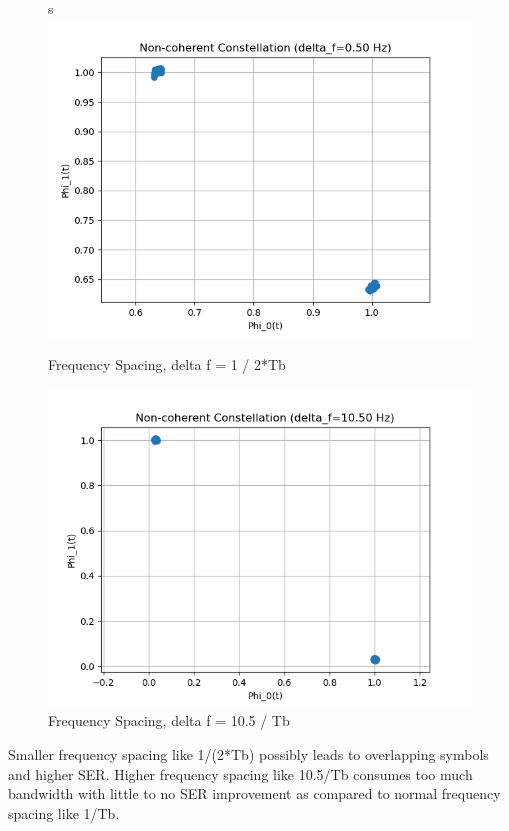 \documentclass[
	letterpaper, %
	10pt, %
]{CSUniSchoolLabReport}
\begin{document}
\begin{figure}[H] %
	\centering %
s	\includegraphics[width=1.2\textwidth]{freq_separation1.png} %
	\caption{Frequency Spacing, delta f = 1 / 2*Tb}
	\label{fig:block}
\end{figure}

\begin{figure}[H] %
	\centering %
	\includegraphics[width=1.2\textwidth]{freq_separation2.png} %
	\caption{Frequency Spacing, delta f = 10.5 / Tb}
	\label{fig:block}
\end{figure}

Smaller frequency spacing like 1/(2*Tb) possibly leads to overlapping symbols and higher SER. \newline
Higher frequency spacing like 10.5/Tb consumes too much bandwidth with little to no SER improvement as compared to normal frequency spacing like 1/Tb.
\end{document}
